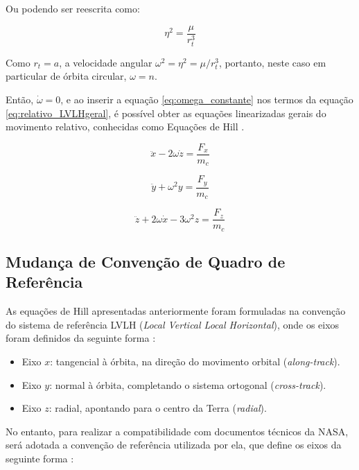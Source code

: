 Ou podendo ser reescrita como:

\begin{equation}
\label{eq:omega_constante2}
\eta^2 = \frac{\mu}{r_t^3}
\end{equation}

Como $r_t=a$, a velocidade angular $\omega^{2}= \eta^2 = \mu/r_t^{3}$, portanto, neste caso em particular de órbita circular, $\omega=n$.

Então, $\dot{\omega}=0$, e ao inserir a equação \eqref{eq:omega_constante} nos termos da equação \eqref{eq:relativo_LVLHgeral}, é possível obter as equações linearizadas gerais do movimento relativo, conhecidas como Equações de Hill \cite{hill1878,fehse2003, wie2008space}.

\begin{equation}
    \label{eq:equacoes_HillX}
\ddot{x} - 2\omega \dot{z} = \frac{F_x}{m_c}
\end{equation}

\begin{equation}
    \label{eq:equacoes_HillY}
\ddot{y} + \omega^2 y = \frac{F_y}{m_c}
\end{equation}

\begin{equation}
    \label{eq:equacoes_HillZ}
\ddot{z} + 2\omega \dot{x} - 3 \omega^2 z = \frac{F_z}{m_c}
\end{equation}

\subsection{Mudança de Convenção de Quadro de Referência}

As equações de Hill apresentadas anteriormente foram formuladas na convenção do sistema de referência LVLH (\emph{Local Vertical Local Horizontal}), onde os eixos foram definidos da seguinte forma \cite{fehse2003}:

\begin{itemize}
    \item Eixo $x$: tangencial à órbita, na direção do movimento orbital (\emph{along-track}).
    \item Eixo $y$: normal à órbita, completando o sistema ortogonal  (\emph{cross-track}).
    \item Eixo $z$: radial, apontando para o centro da Terra  (\emph{radial}).
\end{itemize}

No entanto, para realizar a compatibilidade com documentos técnicos da NASA, será adotada a convenção de referência utilizada por ela, que define os eixos da seguinte forma \cite{Folta2022}:

